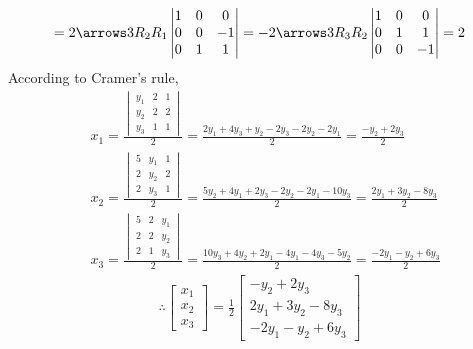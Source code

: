 \begin{itemize}
\begin{align*}
      =
      2
      \arrows3{R_2}{R_1}{}
      \begin{vmatrix}
        1 & 0 & 0\\
        0 & 0 & -1\\
        0 & 1 & 1
      \end{vmatrix}
      =
      -2
      \arrows3{}{R_3}{R_2}
      \begin{vmatrix}
        1 & 0 & 0\\
        0 & 1 & 1\\
        0 & 0 & -1
      \end{vmatrix}
      = 2
    \end{align*}
    According to Cramer's rule,
    \begin{align*}
      &
      x_1 = \frac{\begin{vmatrix}
        y_1 & 2 & 1\\
        y_2 & 2 & 2\\
        y_3 & 1 & 1
      \end{vmatrix}}{2}
      = \frac{2y_1 + 4y_3 + y_2 - 2y_3 - 2y_2 - 2y_1}{2}
      = \frac{-y_2 + 2y_3}{2}
      \\
      &
      x_2 = \frac{\begin{vmatrix}
        5 & y_1 & 1\\
        2 & y_2 & 2\\
        2 & y_3 & 1
      \end{vmatrix}}{2}
      = \frac{5y_2 + 4y_1 + 2y_3 - 2y_2 - 2y_1 - 10y_3}{2}
      = \frac{2y_1 + 3y_2 -8y_3}{2}
      \\
      &
      x_3 = \frac{\begin{vmatrix}
        5 & 2 & y_1\\
        2 & 2 & y_2\\
        2 & 1 & y_3
      \end{vmatrix}}{2}
      = \frac{10y_3 + 4y_2 + 2y_1 - 4y_1 - 4y_3 - 5y_2}{2}
      = \frac{-2y_1 -y_2 + 6y_3}{2}
    \end{align*}
    \begin{align*}
      \therefore
      \begin{bmatrix}
        x_1\\ x_2\\ x_3
      \end{bmatrix}
      = \frac{1}{2} \begin{bmatrix}
        -y_2 + 2y_3\\
        2y_1 + 3y_2 - 8y_3\\
        -2y_1 - y_2 + 6y_3

\end{bmatrix}
\end{align*}
\end{itemize}
